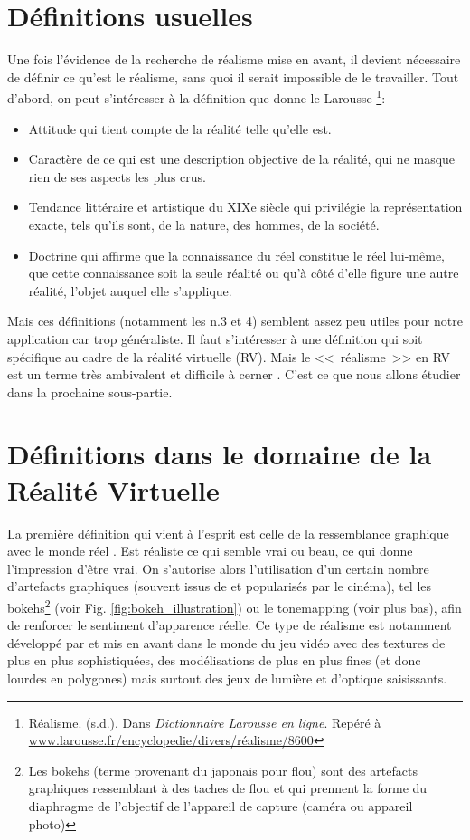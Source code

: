 	\section{Définitions usuelles}
	\par Une fois l'évidence de la recherche de réalisme mise en avant, il devient nécessaire de définir ce qu'est le réalisme, sans quoi il serait impossible de le travailler. Tout d'abord, on peut s'intéresser à la définition que donne le Larousse \footnote{Réalisme. (s.d.). Dans \textit{Dictionnaire Larousse en ligne}. Repéré à \url{www.larousse.fr/encyclopedie/divers/réalisme/8600}}:
	\begin{itemize}
		\item Attitude qui tient compte de la réalité telle qu'elle est.
		\item Caractère de ce qui est une description objective de la réalité, qui ne masque rien de ses aspects les plus crus.
		\item Tendance littéraire et artistique du XIXe siècle qui privilégie la représentation exacte, tels qu'ils sont, de la nature, des hommes, de la société.
		\item Doctrine qui affirme que la connaissance du réel constitue le réel lui-même, que cette connaissance soit la seule réalité ou qu'à côté d'elle figure une autre réalité, l'objet auquel elle s'applique.
	\end{itemize}
	
	\par Mais ces définitions (notamment les n.3 et 4) semblent assez peu utiles pour notre application car trop généraliste. Il faut s'intéresser à une définition qui soit spécifique au cadre de la réalité virtuelle (RV). Mais le <<~réalisme~>> en RV est un terme très ambivalent et difficile à cerner \citep{burkhardt_realite_2003}. C'est ce que nous allons étudier dans la prochaine sous-partie.
	
	\section{Définitions dans le domaine de la Réalité Virtuelle}	
	\par La première définition qui vient à l'esprit est celle de la ressemblance graphique avec le monde réel \citep{ferwerda_model_1996}. Est réaliste ce qui semble vrai ou beau, ce qui donne l'impression d'être vrai. On s'autorise alors l'utilisation d'un certain nombre d'artefacts graphiques (souvent issus de et popularisés par le cinéma), tel les bokehs\footnote{Les bokehs (terme provenant du japonais pour flou) sont des artefacts graphiques ressemblant à des taches de flou et qui prennent la forme du diaphragme de l'objectif de l'appareil de capture (caméra ou appareil photo)} (voir Fig. \ref{fig:bokeh_illustration}) ou le tonemapping (voir plus bas), afin de renforcer le sentiment d'apparence réelle. Ce type de réalisme est notamment développé par et mis en avant dans le monde du jeu vidéo avec des textures de plus en plus sophistiquées, des modélisations de plus en plus fines (et donc lourdes en polygones) mais surtout des jeux de lumière et d'optique saisissants.
	
